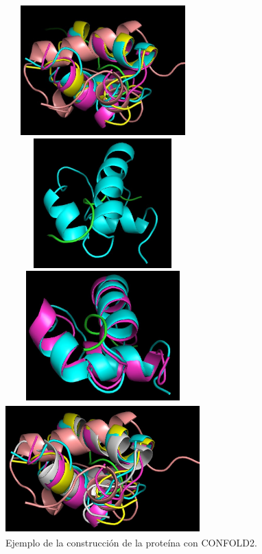 \documentclass{article}
\begin{document}
\begin{enumerate}
		
		
		\begin{figure}[h]
			\centering
			\begin{multicols}{2}
				\includegraphics[width=7.5cm,height=5cm]{img/papers/protein_1}\par 
				\includegraphics[width=7.5cm,height=5cm]{img/papers/protein_2}\par 
				\includegraphics[width=7.5cm,height=5cm]{img/papers/protein_3}\par 
				\includegraphics[width=7.5cm,height=5cm]{img/papers/protein_4}\par 
			\end{multicols}
			\caption{Ejemplo de la construcción de la proteína con CONFOLD2.}
			\label{fig:protein_1}
		\end{figure}
		

\end{enumerate}
\end{document}
